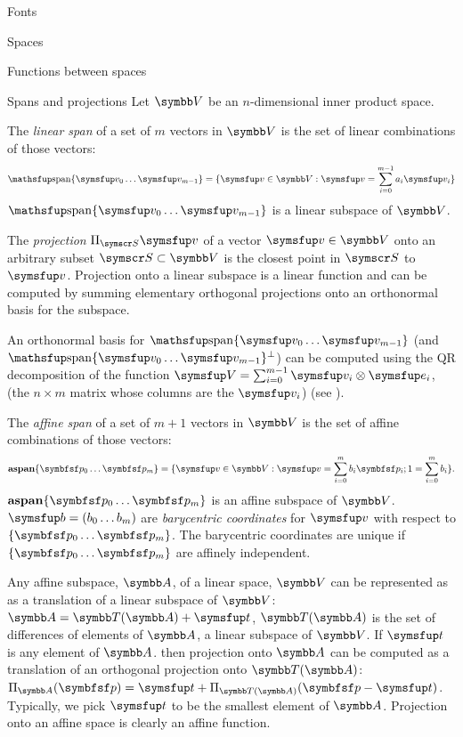 \documentclass[12pt]{PalisadesLakesArticle}
\begin{document}
\begin{plSection}{Fonts}
\begin{plSection}{Spaces}
\begin{plSection}{Functions between spaces}
\begin{plSection}{Spans and projections}
Let $\Space{V}$ be an $n$-dimensional inner product space.

The \textit{linear span} of a set of $m$ vectors in $\Space{V}$
is the set of linear combinations of those vectors:
\begin{equation}
\linearspan\{ \Vector{v}_0 \ldots \Vector{v}_{m-1} \} = \{\Vector{v} \in \Space{V} : \Vector{v} = \sum_{i=0}^{m-1} a_i \Vector{v}_i\}
\end{equation}
$\linearspan\{ \Vector{v}_0 \ldots \Vector{v}_{m-1} \}$ is a linear subspace of $\Space{V}$.

The \textit{projection} $\Projection_{\Set{S}} \Vector{v}$ of a vector $\Vector{v} \in \Space{V}$
onto an arbitrary subset $\Set{S} \subset \Space{V}$
is the closest point in $\Set{S}$ to $\Vector{v}$.
Projection onto a linear subspace is a linear function and
can be computed by summing
elementary orthogonal projections onto an orthonormal basis for the subspace.

An orthonormal basis for $\linearspan\{ \Vector{v}_0 \ldots \Vector{v}_{m-1} \}$
(and $\linearspan\{ \Vector{v}_0 \ldots \Vector{v}_{m-1} \}^\perp$)
can be computed using the QR decomposition
of the function $\Vector{V} = \sum_{i=0}^{m-1} \Vector{v}_i \otimes \Vector{e}_i$,
(the $n \times m$ matrix whose columns are the $\Vector{v}_i$)
(see ).

The \textit{affine span} of a set of $m+1$ vectors in $\Space{V}$
is the set of affine combinations of those vectors:
\begin{equation}
\affinespan\{ \Point{p}_0 \ldots \Point{p}_{m} \} = \{\Vector{v} \in \Space{V} : \Vector{v} = \sum_{i=0}^{m} b_i \Point{p}_i;
1 = \sum_{i=0}^{m} b_i \}.
\end{equation}
$\affinespan\{ \Point{p}_0 \ldots \Point{p}_{m} \}$ is an affine subspace of $\Space{V}$.
$\Vector{b} = ( b_0 \ldots b_m )$ are \textit{barycentric coordinates}
for $\Vector{v}$ with respect to $\{ \Point{p}_0 \ldots \Point{p}_{m} \}$.
The barycentric coordinates are unique if $\{ \Point{p}_0 \ldots \Point{p}_{m} \}$
are affinely independent.

Any affine subspace, $\Space{A}$, of a linear space, $\Space{V}$ can be represented as
as a translation of a linear subspace of $\Space{V}$:
$\Space{A} = \Space{T}(\Space{A}) + \Vector{t}$,
$\Space{T}(\Space{A})$ is the set of differences of elements of $\Space{A}$,
a linear subspace of $\Space{V}$.
If $\Vector{t}$ is any element of $\Space{A}$.
then projection onto $\Space{A}$
can be computed as a translation of an orthogonal projection onto $\Space{T}(\Space{A})$:
$\Projection_{\Space{A}} (\Point{p}) = \Vector{t} + \Projection_{\Space{T}(\Space{A})} (\Point{p} - \Vector{t})$.
Typically, we pick $\Vector{t}$ to be the smallest element of $\Space{A}$.
Projection onto an affine space is clearly an affine function.


\end{plSection}
\end{plSection}
\end{plSection}
\end{plSection}
\end{document}
